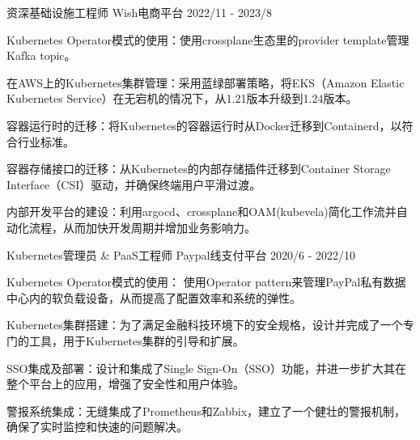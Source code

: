 

\begin{cventries}

\cventry
  {资深基础设施工程师} %
  {Wish电商平台} %
  {} %
  {2022/11 - 2023/8} %
  {
    \begin{cvitems} %
      \item {Kubernetes Operator模式的使用：使用crossplane生态里的provider template管理Kafka topic。}
      \item {在AWS上的Kubernetes集群管理：采用蓝绿部署策略，将EKS（Amazon Elastic Kubernetes Service）在无宕机的情况下，从1.21版本升级到1.24版本。}
      \item {容器运行时的迁移：将Kubernetes的容器运行时从Docker迁移到Containerd，以符合行业标准。}
      \item {容器存储接口的迁移：从Kubernetes的内部存储插件迁移到Container Storage Interface（CSI）驱动，并确保终端用户平滑过渡。}
      \item {内部开发平台的建设：利用argocd、crossplane和OAM(kubevela)简化工作流并自动化流程，从而加快开发周期并增加业务影响力。}
    \end{cvitems}
  }

% 
% 
%
% 
% 
  
  \cventry
    {Kubernetes管理员 \& PaaS工程师} %
    {Paypal线支付平台} %
    {} %
    {2020/6 - 2022/10} %
    {
      \begin{cvitems} %
        \item {Kubernetes Operator模式的使用： 使用Operator pattern来管理PayPal私有数据中心内的软负载设备，从而提高了配置效率和系统的弹性。}
        \item {Kubernetes集群搭建：为了满足金融科技环境下的安全规格，设计并完成了一个专门的工具，用于Kubernetes集群的引导和扩展。}
        \item {SSO集成及部署：设计和集成了Single Sign-On（SSO）功能，并进一步扩大其在整个平台上的应用，增强了安全性和用户体验。        }
        \item {警报系统集成：无缝集成了Prometheus和Zabbix，建立了一个健壮的警报机制，确保了实时监控和快速的问题解决。 }
      \end{cvitems}
    }











\end{cventries}
